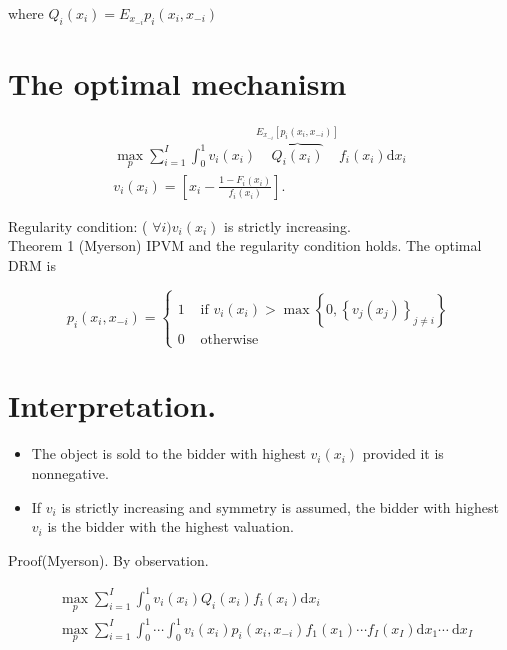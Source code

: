 \documentclass[10pt]{article}
\begin{document}
where $Q_{i}\left(x_{i}\right)=E_{x_{-i}} p_{i}\left(x_{i}, x_{-i}\right)$

\section*{The optimal mechanism}
$$
\begin{array}{r}
\max _{p} \sum_{i=1}^{I} \int_{0}^{1} v_{i}\left(x_{i}\right) \overbrace{Q_{i}\left(x_{i}\right)}^{E_{x_{-i}}\left[p_{i}\left(x_{i}, x_{-i}\right)\right]} f_{i}\left(x_{i}\right) \mathrm{d} x_{i} \\
v_{i}\left(x_{i}\right)=\left[x_{i}-\frac{1-F_{i}\left(x_{i}\right)}{f_{i}\left(x_{i}\right)}\right] .
\end{array}
$$

Regularity condition: ( $\forall i) v_{i}\left(x_{i}\right)$ is strictly increasing.\\
Theorem 1 (Myerson) IPVM and the regularity condition holds. The optimal DRM is

$$
p_{i}\left(x_{i}, x_{-i}\right)= \begin{cases}1 & \text { if } v_{i}\left(x_{i}\right)>\max \left\{0,\left\{v_{j}\left(x_{j}\right)\right\}_{j \neq i}\right\} \\ 0 & \text { otherwise }\end{cases}
$$

\section*{Interpretation.}
\begin{itemize}
  \item The object is sold to the bidder with highest $v_{i}\left(x_{i}\right)$ provided it is nonnegative.
  \item If $v_{i}$ is strictly increasing and symmetry is assumed, the bidder with highest $v_{i}$ is the bidder with the highest valuation.
\end{itemize}

Proof(Myerson). By observation.

$$
\begin{aligned}
& \max _{p} \sum_{i=1}^{I} \int_{0}^{1} v_{i}\left(x_{i}\right) Q_{i}\left(x_{i}\right) f_{i}\left(x_{i}\right) \mathrm{d} x_{i} \\
& \max _{p} \sum_{i=1}^{I} \int_{0}^{1} \cdots \int_{0}^{1} v_{i}\left(x_{i}\right) p_{i}\left(x_{i}, x_{-i}\right) f_{1}\left(x_{1}\right) \cdots f_{I}\left(x_{I}\right) \mathrm{d} x_{1} \cdots \mathrm{~d} x_{I}
\end{aligned}
$$
\end{document}
